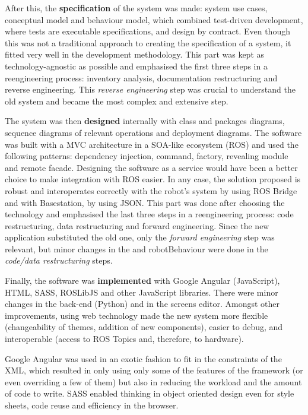 After this, the \textbf{specification} of the system was made: system use cases, conceptual model and behaviour model, which combined test-driven development, where tests are executable specifications, and design by contract.
Even though this was not a traditional approach to creating the specification of a system, it fitted very well in the development methodology.
This part was kept as technology-agnostic as possible and emphasised the first three steps in a reengineering process: inventory analysis, documentation restructuring and reverse engineering.
This \emph{reverse engineering} step was crucial to understand the old system and became the most complex and extensive step.

The system was then \textbf{designed} internally with class and packages diagrams, sequence diagrams of relevant operations and deployment diagrams.
The software was built with a \ac{MVC} architecture in a \ac{SOA}-like ecosystem (\ac{ROS}) and used the following patterns: dependency injection, command, factory, revealing module and remote facade.
Designing the software as a service would have been a better choice to make integration with \ac{ROS} easier.
In any case, the solution proposed is robust and interoperates correctly with the robot's system by using ROS Bridge and with Basestation, by using JSON.
This part was done after choosing the technology and emphasised the last three steps in a reengineering process: code restructuring, data restructuring and forward engineering.
Since the new application substituted the old one, only the \emph{forward engineering} step was relevant, but minor changes in the \flangobe and robotBehaviour were done in the \emph{code/data restructuring} steps.

Finally, the software was \textbf{implemented} with Google Angular (JavaScript), \ac{HTML}, \ac{SASS}, ROSLibJS and other JavaScript libraries.
There were minor changes in the back-end (Python) and in the screens editor.
Amongst other improvements, using web technology made the new system more flexible (changeability of themes, addition of new components), easier to debug, and interoperable (access to ROS Topics and, therefore, to hardware).

Google Angular was used in an exotic fashion to fit in the constraints of the \ac{XML}, which resulted in only using only some of the features of the framework (or even overriding a few of them) but also in reducing the workload and the amount of code to write.
\ac{SASS} enabled thinking in object oriented design even for style sheets, code reuse and efficiency in the browser.

